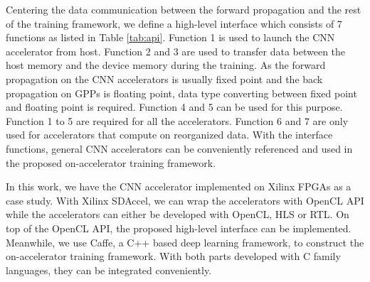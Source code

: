 Centering the data communication between the forward propagation 
and the rest of the training framework, we define a high-level 
interface which consists of 7 functions as listed in Table \ref{tab:api}. 
Function 1 is used to launch the CNN accelerator from host. 
Function 2 and 3 are used to transfer data between the host memory and the device memory during 
the training. As the forward propagation on the CNN accelerators is usually fixed point 
and the back propagation on GPPs is floating point, data type converting between fixed point 
and floating point is required. Function 4 and 5 can be used for this purpose. 
Function 1 to 5 are required for all the accelerators. 
Function 6 and 7 are only used for accelerators that compute on reorganized data\cite{pipecnn_2,deepburing_12}. 
With the interface functions, general CNN accelerators can be conveniently 
referenced and used in the proposed on-accelerator training framework. 

In this work, we have the CNN accelerator implemented on Xilinx FPGAs as a case study. 
With Xilinx SDAccel, we can wrap the accelerators with OpenCL API while the accelerators 
can either be developed with OpenCL, HLS or RTL. On top of the OpenCL API, the proposed 
high-level interface can be implemented. Meanwhile, we use Caffe, a C++ based 
deep learning framework, to construct the on-accelerator training framework. With 
both parts developed with C family languages, they can be integrated conveniently. 



